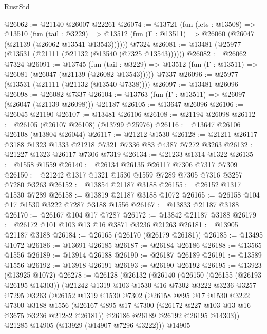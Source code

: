 \begin{lexlean}{RustStd}
\begin{coremodule}
@26062 := @21140 @26007 @22261
@26074 := @13721
    (fun (lets : @13508) =>
    @13510
      (fun (tail : @3229) =>
      @13512 (fun (Γ : @13511) => @26060 (@26047 (@21139 (@26062 @13541 @13543))))))
    @7324
@26081 := @13481 (@25977 (@13531 (@21111 (@21132 (@13540 (@7325 @13543))))))
@26082 := @26062 @7324
@26091 := @13745
    (fun (tail : @3229) => @13512 (fun (Γ : @13511) => @26081 (@26047 (@21139 (@26082 @13543)))))
    @7337
@26096 := @25977 (@13531 (@21111 (@21132 (@13540 @7338))))
@26097 := @13481 @26096
@26098 := @26082 @7337
@26104 := @13763 (fun (Γ : @13511) => @26097 (@26047 (@21139 @26098))) @21187
@26105 := @13647 @26096
@26106 := @26045 @21190
@26107 := @13481 @26106
@26108 := @21194 @26098
@26112 := @26105 (@26107 @26108) (@13799 @25976)
@26116 := @13647 @26106 @26108 (@13804 @26044)
@26117 := @21212 @1530
@26128 := @21211 @26117 @3188 @1323 @1333 @21218 @7321 @7336 @83 @4387 @7272 @3263
@26132 := @21227 @1323 @26117 @7306 @7319
@26134 := @21233 @1314 @1322
@26135 := @1558 @1559
@26140 := @26134 @26135 @26117 @7306 @7317 @7309
@26150 := @21242 @1317 @1321 @1530 @1559 @7289 @7305 @7316 @3257 @7280 @3263
@26152 := @13854 @21187 @3188
@26155 := @26152 @1317 @1530 @7289
@26158 := @13819 @21187 @3188 @1072
@26165 := @26158 @104 @17 @1530 @3222 @7287 @3188 @1556
@26167 := @13833 @21187 @3188
@26170 := @26167 @104 @17 @7287
@26172 := @13842 @21187 @3188
@26179 := @26172 @101 @103 @13 @16 @3871 @3236 @21263
@26181 := @13905 @21187 @3188
@26184 := @26165 (@26170 (@26179 @26181))
@26185 := @13495 @1072
@26186 := @13691 @26185
@26187 := @26184 @26186
@26188 := @13565 @1556
@26189 := @13914 @26188
@26190 := @26187 @26189
@26191 := @13589 @1556
@26192 := @13918 @26191
@26193 := @26190 @26192
@26195 := @13923 (@13925 @1072)
@26278 := @26128
    (@26132
      (@26140
        (@26150
          (@26155 (@26193 @26195 @14303))
          (@21242
            @1319
            @103
            @1530
            @16
            @7302
            @3222
            @3236
            @3257
            @7295
            @3263
            (@26152
              @1319
              @1530
              @7302
              (@26158
                @895
                @17
                @1530
                @3222
                @7300
                @3188
                @1556
                (@26167 @895 @17 @7300 (@26172 @227 @103 @13 @16 @3675 @3236 @21282 @26181))
                @26186
                @26189
                @26192
                @26195
                @14303))
            @21285
            @14905
            (@13929 (@14907 @7296 @3222)))
          @14905

\end{coremodule}
\end{lexlean}

